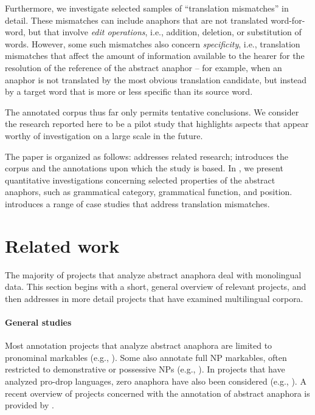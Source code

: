 \documentclass[output=paper]{LSP/langsci}
\begin{document}
Furthermore, we investigate selected samples of ``translation mismatches'' in detail. These mismatches can include anaphors that are not translated word-for-word, but that involve \emph{edit operations}, i.e., addition, deletion, or substitution of words.  However, some such mismatches also concern  \emph{specificity}, i.e., translation mismatches that affect the amount of information available to the hearer for the resolution of the reference of the abstract anaphor -- for example, when an anaphor is not translated by the most obvious translation candidate, but instead by a target word that is more or less specific than its source word.


The annotated corpus thus far only permits tentative conclusions. We consider the research reported here to be a pilot study that highlights aspects  that appear worthy of investigation on a large scale in the future.


The paper is organized as follows:  addresses related research;  introduces the corpus and the annotations upon which the study is based. In , we present quantitative investigations concerning selected properties of the abstract anaphors, such as grammatical category, grammatical function, and position.  introduces a range of case studies that address translation mismatches. %


\section{Related work}
\label{sec:rel}
The majority of projects that analyze abstract anaphora deal with monolingual data. This section begins with a short,  general overview of relevant projects, and then addresses in more detail projects  that have examined multilingual corpora.

\paragraph*{General studies} Most annotation projects that analyze abstract anaphora are limited to pronominal markables (e.g., \citealt{Byron2003, hedbergEtAl07,muller:2007:ACLMain}). Some also annotate full NP markables, often restricted to demonstrative or possessive NPs (e.g., \citealt{vieiraEtAl02, Pradhan2007, arrau08}). %
In projects that have analyzed pro-drop languages, zero anaphora have also been considered (e.g., \citealt{recasens08, navarretta+olsen08}). A recent overview of projects concerned with the annotation of abstract anaphora is provided by \cite{Dipper2010}. 
\end{document}
